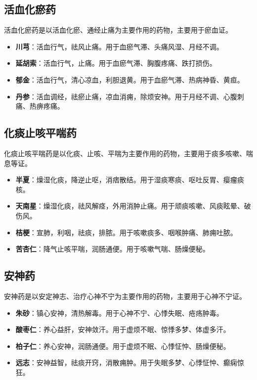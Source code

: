 \documentclass[12pt,UTF8]{ctexbook}
\begin{document}
\subsection{活血化瘀药}

活血化瘀药是以活血化瘀、通经止痛为主要作用的药物，主要用于瘀血证。

\begin{itemize}
\item \textbf{川芎}：活血行气，祛风止痛。用于血瘀气滞、头痛风湿、月经不调。
\item \textbf{延胡索}：活血行气，止痛。用于血瘀气滞、胸腹疼痛、跌打损伤。
\item \textbf{郁金}：活血行气，清心凉血，利胆退黄。用于血瘀气滞、热病神昏、黄疸。
\item \textbf{丹参}：活血调经，祛瘀止痛，凉血消痈，除烦安神。用于月经不调、心腹刺痛、热痹疼痛。
\end{itemize}

\subsection{化痰止咳平喘药}

化痰止咳平喘药是以化痰、止咳、平喘为主要作用的药物，主要用于痰多咳嗽、喘息等证。

\begin{itemize}
\item \textbf{半夏}：燥湿化痰，降逆止呕，消痞散结。用于湿痰寒痰、呕吐反胃、瘿瘤痰核。
\item \textbf{天南星}：燥湿化痰，祛风解痉，外用消肿止痛。用于顽痰咳嗽、风痰眩晕、破伤风。
\item \textbf{桔梗}：宣肺，利咽，祛痰，排脓。用于咳嗽痰多、咽喉肿痛、肺痈吐脓。
\item \textbf{苦杏仁}：降气止咳平喘，润肠通便。用于咳嗽气喘、肠燥便秘。
\end{itemize}

\subsection{安神药}

安神药是以安定神志、治疗心神不宁为主要作用的药物，主要用于心神不宁证。

\begin{itemize}
\item \textbf{朱砂}：镇心安神，清热解毒。用于心神不宁、心悸失眠、疮疡肿毒。
\item \textbf{酸枣仁}：养心益肝，安神敛汗。用于虚烦不眠、惊悸多梦、体虚多汗。
\item \textbf{柏子仁}：养心安神，润肠通便。用于虚烦不眠、心悸怔忡、肠燥便秘。
\item \textbf{远志}：安神益智，祛痰开窍，消散痈肿。用于失眠多梦、心悸怔忡、癫痫惊狂。
\end{itemize}
\end{document}
